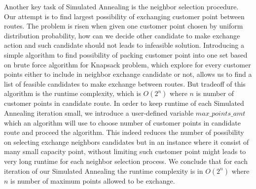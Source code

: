 \documentclass[12pt]{article}
\begin{document}
Another key task of Simulated Annealing is the neighbor selection procedure. Our attempt is to find largest possibility of exchanging customer point between routes. The problem is risen when given one customer point chosen by uniform distribution probability, how can we decide other candidate to make exchange action and such candidate should not leads to infeasible solution. Introducing a simple algorithm to find possibility of packing customer point into one set based on brute force algorithm for Knapsack problem, which explore for every customer points either to include in neighbor exchange candidate or not, allows us to find a list of feasible candidates to make exchange between routes. But tradeoff of this algorithm is the runtime complexity, which is $O(2^n)$ where $n$ is number of customer points in candidate route. In order to keep runtime of each Simulated Annealing iteration small, we introduce a user-defined variable $max\_points\_amt$ which an algorithm will use to choose number of customer points in candidate route and proceed the algorithm. This indeed reduces the number of possibility on selecting exchange neighbors candidates but in an instance where it consist of many small capacity point, without limiting such customer point might leads to very long runtime for each neighbor selection process. We conclude that for each iteration of our Simulated Annealing the runtime complexity is in $O(2^n)$ where $n$ is number of maximum points allowed to be exchange.



\newpage
\end{document}
